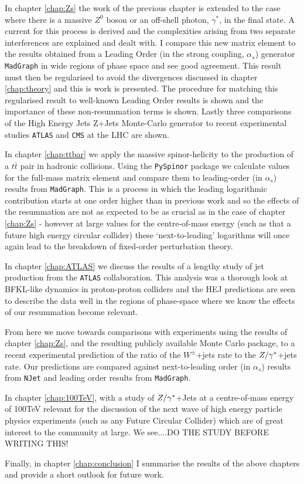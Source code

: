 	In chapter \ref{chap:Zs} the work of the previous chapter is extended to the case where there is a massive $Z^0$ boson or an off-shell photon, $\gamma^*$,
	in the final state.  A current for this process is derived and the complexities arising from two separate interferences are explained and dealt with.  I
	compare this new matrix element to the results obtained from a Leading Order (in the strong coupling, $\alpha_s$) generator \texttt{MadGraph} in wide
	regions of phase space and see good agreement.  This result must then be regularised to avoid the divergences discussed in chapter \ref{chap:theory} and
	this is work is presented.  The procedure for matching this regularised result to well-known Leading Order results is shown and the importance of these
	non-resummation terms is shown.  Lastly three comparisons of the High Energy Jets Z+Jets Monte-Carlo generator to recent experimental studies
	\texttt{ATLAS} and \texttt{CMS} at the LHC are shown.

	In chapter \ref{chap:ttbar} we apply the massive spinor-helicity to the production of a $t\overline t$ pair in hadronic collisions.  Using the
	\texttt{PySpinor} package we calculate values for the full-mass matrix element and compare them to leading-order (in $\alpha_s$) results from
	\texttt{MadGraph}.  This is a process in which the leading logarithmic contribution starts at one order higher than in previous work and so the effects
	of the resummation are not as expected to be as crucial as in the case of chapter \ref{chap:Zs} - however at large values for the centre-of-mass energy
	(such as that a future high energy circular collider) these `next-to-leading' logarithms will once again lead to the breakdown of fixed-order
	perturbation theory.

	In chapter \ref{chap:ATLAS} we discuss the results of a lengthy study of jet production from the \texttt{ATLAS} collaboration.  This analysis was a thorough
	look at BFKL-like dynamics in proton-proton colliders and the HEJ predictions are seen to describe the data well in the regions of phase-space where
	we know the effects of our resummation become relevant.

	From here we move towards comparisons with experiments using the results of chapter \ref{chap:Zs}, and the resulting publicly available Monte Carlo
	package, to a recent experimental prediction of the ratio of the $W^\pm$+jets rate to the ${Z/\gamma^*}$+jets rate.  Our predictions are compared against
	next-to-leading order (in $\alpha_s$) results from \texttt{NJet} and leading order results from \texttt{MadGraph}.

	In chapter \ref{chap:100TeV}, with a study of ${Z/\gamma^*}$+Jets at a centre-of-mass energy of 100TeV relevant for the discussion of
	the next wave of high energy particle physics experiments (such as any Future Circular Collider) which are of great interest to the community at large.  We see....DO THE STUDY BEFORE
	WRITING THIS!

	Finally, in chapter \ref{chap:conclusion} I summarise the results of the above chapters and provide a short outlook for future work.

